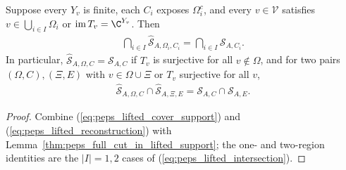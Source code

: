 \begin{lemma}%
    \label{thm:peps_lifted_cut_intersection}
    \leanok
    Suppose every $Y_v$ is finite, each $C_i$ exposes $\Omega_i^c$, and every
    $v\in\mathcal V$ satisfies $v\in\bigcup_{i\in I}\Omega_i$ or
    $\operatorname{im}T_v=\C^{Y_v}$. Then
    \begin{align}
        \bigcap_{i\in I}\widehat{\mathcal S}_{A,\Omega_i,C_i}
        =\bigcap_{i\in I}\mathcal S_{A,C_i}.
        \label{eq:peps_lifted_intersection}
    \end{align}
    In particular, $\widehat{\mathcal S}_{A,\Omega,C}=\mathcal S_{A,C}$ if
    $T_v$ is surjective for all $v\notin\Omega$, and for two pairs
    $(\Omega,C),(\Xi,E)$ with $v\in\Omega\cup\Xi$ or $T_v$ surjective for all $v$,
    \begin{align}
        \widehat{\mathcal S}_{A,\Omega,C}
        \cap\widehat{\mathcal S}_{A,\Xi,E}
        =\mathcal S_{A,C}\cap\mathcal S_{A,E}.
        \label{eq:peps_two_lifted_intersection}
    \end{align}
\end{lemma}
\begin{proof}\leanok
    Combine (\ref{eq:peps_lifted_cover_support}) and
    (\ref{eq:peps_lifted_reconstruction}) with
    Lemma~\ref{thm:peps_full_cut_in_lifted_support}; the one- and two-region
    identities are the $|I|=1,2$ cases of (\ref{eq:peps_lifted_intersection}).
\end{proof}


